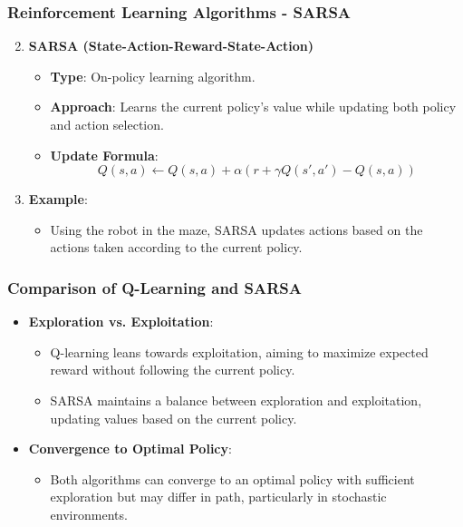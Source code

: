 \documentclass[aspectratio=169]{beamer}
\begin{document}
\begin{frame}[fragile]
    \frametitle{Reinforcement Learning Algorithms - SARSA}
    \begin{enumerate}
        \setcounter{enumi}{1}
        \item \textbf{SARSA (State-Action-Reward-State-Action)}
        \begin{itemize}
            \item \textbf{Type}: On-policy learning algorithm.
            \item \textbf{Approach}: Learns the current policy's value while updating both policy and action selection.
            
            \item \textbf{Update Formula}:
            \begin{equation}
                Q(s, a) \leftarrow Q(s, a) + \alpha \left( r + \gamma Q(s', a') - Q(s, a) \right)
            \end{equation}
        \end{itemize}

        \item \textbf{Example}:
        \begin{itemize}
            \item Using the robot in the maze, SARSA updates actions based on the actions taken according to the current policy.
        \end{itemize}
    \end{enumerate}
\end{frame}

\begin{frame}[fragile]
    \frametitle{Comparison of Q-Learning and SARSA}
    \begin{itemize}
        \item \textbf{Exploration vs. Exploitation}:
        \begin{itemize}
            \item Q-learning leans towards exploitation, aiming to maximize expected reward without following the current policy.
            \item SARSA maintains a balance between exploration and exploitation, updating values based on the current policy.
        \end{itemize}

        \item \textbf{Convergence to Optimal Policy}:
        \begin{itemize}
            \item Both algorithms can converge to an optimal policy with sufficient exploration but may differ in path, particularly in stochastic environments.
        \end{itemize}
    \end{itemize}
\end{frame}
\end{document}
